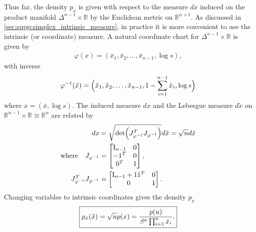 Thus far, the density $p_{x}$ is given with respect to the measure $dx$ induced on the product manifold $\Delta^{n-1}\times\mathbb{R}$ by the Euclidean metric on $\mathbb{R}^{n+1}$.
As discussed in \cref{sec:supp:simplex_intrinsic_measure}, in practice it is more convenient to use the intrinsic (or coordinate) measure.
A natural coordinate chart for $\Delta^{n-1}\times\mathbb{R}$ is given by
\begin{align}
    \varphi(x) = (\bar{x}_1, \bar{x}_2, \ldots, \bar{x}_{n-1}, \log s),
\end{align}
with inverse
\begin{align}
    \varphi^{-1}(\tilde{x}) = \Bigl(\tilde{x}_1, \tilde{x}_2, \ldots, \tilde{x}_{n-1}, 1-\sum_{i=1}^{n-1}\tilde{x}_i, \log s\Bigr)
\end{align}
where $x = (\bar{x}, \log s)$.
The induced measure $dx$ and the Lebesgue measure $d\tilde{x}$ on $\mathbb{R}^{n-1}\times\mathbb{R} \cong \mathbb{R}^n$ are related by
\begin{align}
    dx                                  & = \sqrt{\Det{J_{\varphi^{-1}}^T J_{\varphi^{-1}}}} d\tilde{x} = \sqrt{n} d\tilde{x} \\
    \text{where} \quad J_{\varphi^{-1}} & = \begin{bmatrix} \Id_{n-1} & \Zero \\ -\One^T & \Zero \\ \Zero^T & 1\end{bmatrix}, \nonumber                                             \\
    J_{\varphi^{-1}}^T J_{\varphi^{-1}} & = \begin{bmatrix} \Id_{n-1} + \One \One^T & \Zero \\ \Zero & 1\end{bmatrix}. \nonumber
\end{align}
Changing variables to intrinsic coordinates gives the density $p_{\tilde{x}}$
\begin{align}\label{eqn:supp:xform_density_softmax_intrinsic}
    \boxed{p_{\tilde{x}}(\tilde{x}) = \sqrt{n} p(x) = \frac{p(u)}{\beta^n \prod_{i=1}^{n} \bar{x}_i}.}
\end{align}
